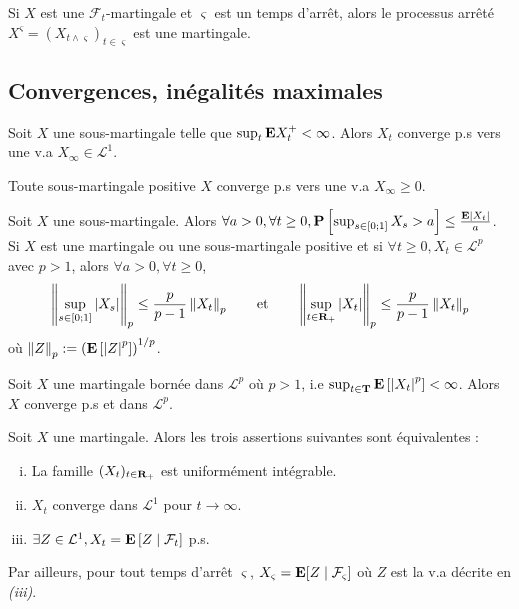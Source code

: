 	\begin{thm}
		Si $X$ est une $\mathcal{F}_t$-martingale et $\varsigma$ est un temps d'arrêt, alors le processus arrêté $X^{\varsigma} = (X_{t \wedge \varsigma})_{t \in \varsigma}$ est une martingale.
	\end{thm}


\subsection{Convergences, inégalités maximales}

	\begin{thm}
		Soit $X$ une sous-martingale telle que $\sup_t \mathbf{E} X_t^+ < \infty$.
		Alors $X_t$ converge p.s vers une v.a $X_\infty \in \mathcal{L}^1$.
	\end{thm}
	
	\begin{cor}
		Toute sous-martingale positive $X$ converge p.s vers une v.a $X_\infty \geq 0$.
	\end{cor}
	
	\begin{thm}
		Soit $X$ une sous-martingale.
		Alors $\forall a > 0, \forall t \geq 0, \mathbf{P} \left[ \sup_{s \in \mathopen{}\mathclose{\left[0\mathclose{}\mathpunct{};1\right]}} X_s > a \right] \leq \frac{\mathbf{E} \left\lvert X_t\right\rvert}{a}$.
		Si $X$ est une martingale ou une sous-martingale positive et si $\forall t \geq 0, X_t \in \mathcal{L}^p$ avec $p > 1$, alors $\forall a > 0, \forall t \geq 0$,
		$$\left\lVert\sup_{s \in \mathopen{}\mathclose{\left[0\mathclose{}\mathpunct{};1\right]}} \left\lvert X_s\right\rvert\right\rVert_p \leq \frac{p}{p - 1} \left\lVert X_t\right\rVert_p
			\qquad \text{et} \qquad
			\left\lVert\sup_{t \in \mathbf{R}_+} \left\lvert X_t\right\rvert\right\rVert_p \leq \frac{p}{p - 1} \left\lVert X_t\right\rVert_p$$
		où $\left\lVert Z\right\rVert_p := \left( \mathbf{E} \left[ \left\lvert Z\right\rvert^p \right] \right)^{1/p}$.
	\end{thm}
	
	\begin{thm}
		Soit $X$ une martingale bornée dans $\mathcal{L}^p$ où $p > 1$, i.e $\sup_{t \in \mathbf{T}} \mathbf{E} \left[ \left\lvert X_t\right\rvert^p \right] < \infty$.
		Alors $X$ converge p.s et dans $\mathcal{L}^p$.
	\end{thm}
	
	\begin{thm}
		Soit $X$ une martingale.
		Alors les trois assertions suivantes sont équivalentes :
		\begin{enumerate}[(i)]
			\item La famille $(X_t)_{t \in \mathbf{R}_+}$ est uniformément intégrable.
			\item $X_t$ converge dans $\mathcal{L}^1$ pour $t \longrightarrow \infty$.
			\item $\exists Z \in \mathcal{L}^1, X_t = \mathbf{E} \left[ Z \mid \mathcal{F}_t \right]$ p.s.
		\end{enumerate}
		Par ailleurs, pour tout temps d'arrêt $\varsigma$, $X_{\varsigma} = \mathbf{E} [Z \mid \mathcal{F}_{\varsigma}]$ où $Z$ est la v.a décrite en \textit{(iii)}.
	\end{thm}



